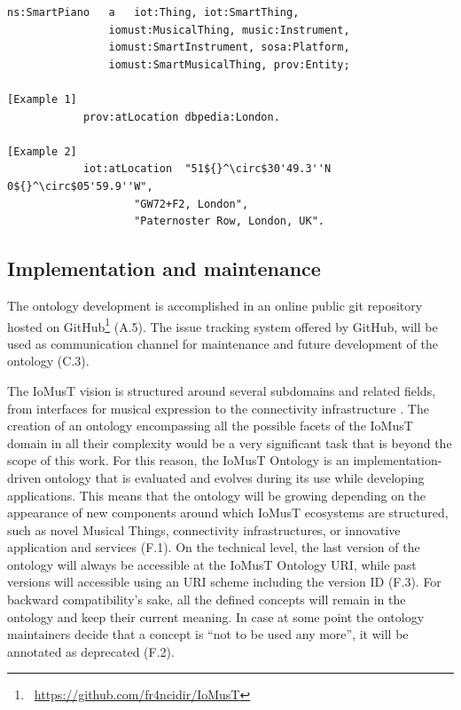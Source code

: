 \begin{lstlisting}[caption={Location triples alternatives. Extended prefixes are available in Table~\ref{tab:prefixes}.}, label={listing:location}, mathescape]
ns:SmartPiano	a	iot:Thing, iot:SmartThing,
    			iomust:MusicalThing, music:Instrument,
    			iomust:SmartInstrument, sosa:Platform,
    			iomust:SmartMusicalThing, prov:Entity;
    
[Example 1]
    		prov:atLocation	dbpedia:London.
    
[Example 2]
    		iot:atLocation 	"51${}^\circ$30'49.3''N 0${}^\circ$05'59.9''W",
        			"GW72+F2, London",
        			"Paternoster Row, London, UK".
\end{lstlisting}

\subsection{Implementation and maintenance}
\label{ssec:implementation_maintenance}
The ontology development is accomplished in an online public git repository hosted on GitHub\footnote{\faGithub~\url{https://github.com/fr4ncidir/IoMusT}} (A.5). The issue tracking system offered by GitHub, will be used as communication channel for maintenance and future development of the ontology (C.3).

The IoMusT vision is structured around several subdomains and related fields, from interfaces for musical expression to the connectivity infrastructure \cite{turchet2018IoMusT}. The creation of an ontology encompassing all the possible facets of the IoMusT domain in all their complexity would be a very significant task that is beyond the scope of this work. For this reason, the IoMusT Ontology is an implementation-driven ontology that is evaluated and evolves during its use while developing applications. This means that the ontology will be growing depending on the appearance of new components around which IoMusT ecosystems are structured, such as novel Musical Things, connectivity infrastructures, or innovative application and services (F.1). On the technical level, the last version of the ontology will always be accessible at the IoMusT Ontology URI, while past versions will accessible using an URI scheme including the version ID (F.3). For backward compatibility's sake, all the defined concepts will remain in the ontology and keep their current meaning. In case at some point the ontology maintainers decide that a concept is ``not to be used any more'', it will be annotated as deprecated (F.2).

